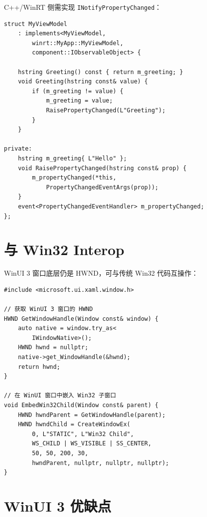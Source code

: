 \documentclass[12pt,a4paper,fontset=fandol]{ctexbook}
\newcommand{\cpplabel}{%
  \tcbox[on line,colback=cppheadbg,colframe=cppheadbg,
    boxrule=0pt,arc=1pt,left=2pt,right=2pt,top=1pt,bottom=1pt,
    colupper=white,fontupper=\scriptsize\bfseries]{C++}}
\newcommand{\Tp}[1]{\texttt{#1}}
\begin{document}
C++/WinRT 侧需实现 \Tp{INotifyPropertyChanged}：

\cpplabel
\begin{lstlisting}[style=cppstyle]
struct MyViewModel
    : implements<MyViewModel,
        winrt::MyApp::MyViewModel,
        component::IObservableObject> {

    hstring Greeting() const { return m_greeting; }
    void Greeting(hstring const& value) {
        if (m_greeting != value) {
            m_greeting = value;
            RaisePropertyChanged(L"Greeting");
        }
    }

private:
    hstring m_greeting{ L"Hello" };
    void RaisePropertyChanged(hstring const& prop) {
        m_propertyChanged(*this,
            PropertyChangedEventArgs(prop));
    }
    event<PropertyChangedEventHandler> m_propertyChanged;
};
\end{lstlisting}

\section{与 Win32 Interop}

WinUI 3 窗口底层仍是 HWND，可与传统 Win32 代码互操作：

\cpplabel
\begin{lstlisting}[style=cppstyle]
#include <microsoft.ui.xaml.window.h>

// 获取 WinUI 3 窗口的 HWND
HWND GetWindowHandle(Window const& window) {
    auto native = window.try_as<
        IWindowNative>();
    HWND hwnd = nullptr;
    native->get_WindowHandle(&hwnd);
    return hwnd;
}

// 在 WinUI 窗口中嵌入 Win32 子窗口
void EmbedWin32Child(Window const& parent) {
    HWND hwndParent = GetWindowHandle(parent);
    HWND hwndChild = CreateWindowEx(
        0, L"STATIC", L"Win32 Child",
        WS_CHILD | WS_VISIBLE | SS_CENTER,
        50, 50, 200, 30,
        hwndParent, nullptr, nullptr, nullptr);
}
\end{lstlisting}

\section{WinUI 3 优缺点}
\end{document}
